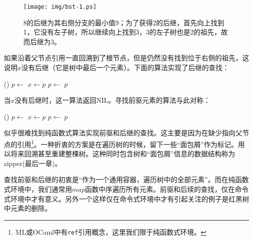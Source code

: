 \documentclass[b5paper]{ctexart}
\begin{document}
\begin{figure}[htbp]
  \centering
  \texttt{[image: img/bst-1.ps]}
  \caption{8的后继为其右侧分支的最小值9；为了获得2的后继，首先向上找到1，它没有左子树，所以继续向上找到3，3的左子树也是2的祖先，故而后继为3。} \label{fig:bst-succ}
\end{figure}

如果沿着父节点引用一直回溯到了根节点，但是仍然没有找到位于右侧的祖先，这说明$x$没有后继（它是树中最后一个元素）。下面的算法实现了后继的查找：

\begin{algorithmic}[1]
    \State \Return {}()
  \Else
    \State $p \gets $ 
      \State $x \gets p$
      \State $p \gets $ 
    \EndWhile
    \State \Return $p$
  \EndIf
\EndFunction
\end{algorithmic}

当$x$没有后继时，这一算法返回NIL。寻找前驱元素的算法与此对称：

\begin{algorithmic}[1]
    \State \Return {}()
  \Else
    \State $p \gets $ 
      \State $x \gets p$
      \State $p \gets $ 
    \EndWhile
    \State \Return $p$
  \EndIf
\EndFunction
\end{algorithmic}

似乎很难找到纯函数式算法实现前驱和后继的查找。这主要是因为在缺少指向父节点的引用\footnote{ML或OCaml中有\texttt{ref}引用概念，这里我们限于纯函数式环境。}。一种折衷的方案是在遍历树的时候，留下一些“面包屑”作为标记。用以将来回溯甚至重建整棵树。这种同时包含树和“面包屑”信息的数据结构称为zipper(\cite{learn-haskell}最后一章)。

查找前驱和后继的初衷是“作为一个通用容器，遍历树中的全部元素”。而在纯函数式环境中，我们通常用$map$函数中序遍历所有元素。前驱和后续的查找，仅在命令式环境中才有意义。另外一个这样仅在命令式环境中才有引起关注的例子是红黑树中元素的删除\cite{okasaki-blog}。

\begin{Exercise}


\end{Exercise}
\end{document}
